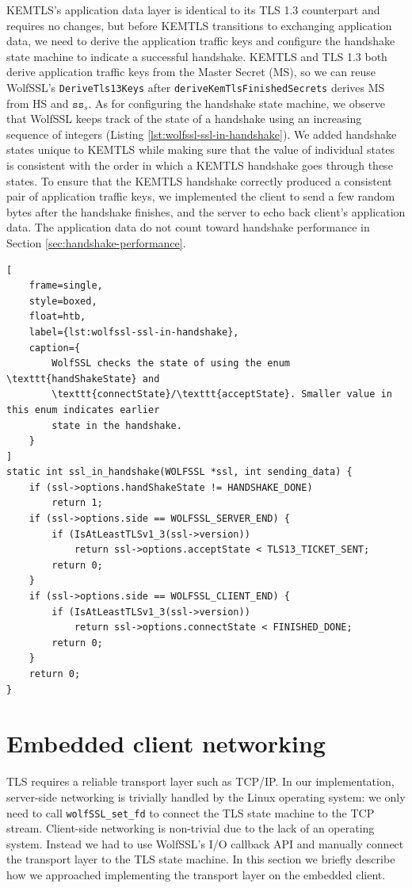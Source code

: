 \documentclass[letterpaper,12pt,titlepage,oneside,final]{book}
\begin{document}
KEMTLS's application data layer is identical to its TLS 1.3 counterpart and requires no changes, but before KEMTLS transitions to exchanging application data, we need to derive the application traffic keys and configure the handshake state machine to indicate a successful handshake.
KEMTLS and TLS 1.3 both derive application traffic keys from the Master Secret (MS), so we can reuse WolfSSL's \texttt{DeriveTls13Keys} after \texttt{deriveKemTlsFinishedSecrets} derives MS from HS and $\texttt{ss}_s$.
As for configuring the handshake state machine, we observe that WolfSSL keeps track of the state of a handshake using an increasing sequence of integers (Listing \ref{lst:wolfssl-ssl-in-handshake}).
We added handshake states unique to KEMTLS while making sure that the value of individual states is consistent with the order in which a KEMTLS handshake goes through these states.
To ensure that the KEMTLS handshake correctly produced a consistent pair of application traffic keys, we implemented the client to send a few random bytes after the handshake finishes, and the server to echo back client's application data.
The application data do not count toward handshake performance in Section \ref{sec:handshake-performance}.

\begin{lstlisting}[
    frame=single, 
    style=boxed, 
    float=htb,
    label={lst:wolfssl-ssl-in-handshake}, 
    caption={
        WolfSSL checks the state of using the enum \texttt{handShakeState} and 
        \texttt{connectState}/\texttt{acceptState}. Smaller value in this enum indicates earlier
        state in the handshake.
    }
]
static int ssl_in_handshake(WOLFSSL *ssl, int sending_data) {
    if (ssl->options.handShakeState != HANDSHAKE_DONE)
        return 1;
    if (ssl->options.side == WOLFSSL_SERVER_END) {
        if (IsAtLeastTLSv1_3(ssl->version))
            return ssl->options.acceptState < TLS13_TICKET_SENT;
        return 0;
    }
    if (ssl->options.side == WOLFSSL_CLIENT_END) {
        if (IsAtLeastTLSv1_3(ssl->version))
            return ssl->options.connectState < FINISHED_DONE;
        return 0;
    }
    return 0;
}
\end{lstlisting}

\section{Embedded client networking}\label{sec:embedded-client-networking}
TLS requires a reliable transport layer such as TCP/IP.
In our implementation, server-side networking is trivially handled by the Linux operating system: we only need to call \texttt{wolfSSL\_set\_fd} to connect the TLS state machine to the TCP stream.
Client-side networking is non-trivial due to the lack of an operating system.
Instead we had to use WolfSSL's I/O callback API and manually connect the transport layer to the TLS state machine.
In this section we briefly describe how we approached implementing the transport layer on the embedded client.
\end{document}
